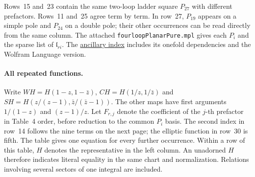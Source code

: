 Rows~15 and~23 contain the same two-loop ladder square \(P_{27}\) with
different prefactors. Rows~11 and~25 agree term by term. In row~27,
\(P_{19}\) appears on a simple pole and \(P_{24}\) on a double pole; their
other occurrences can be read directly from the same column. The attached
\texttt{fourloopPlanarPure.mpl} gives each \(P_i\) and the sparse list of
\(\mathfrak{l}_{ri}\). The \href{https://github.com/windfolgen/svbwalkthrough/tree/main/anc}{ancillary index}
includes its onefold dependencies and the Wolfram Language version.

\clearpage
\paragraph{All repeated functions.}
Write \(WH=H(1-z,1-\bar z)\), \(CH=H(1/z,1/\bar z)\) and
\(SH=H(z/(z-1),\bar z/(\bar z-1))\). The other maps have first arguments
\(1/(1-z)\) and \((z-1)/z\). Let \(F_{r,j}\) denote the coefficient of the \(j\)-th prefactor in Table~4 order, before reduction to the common \(P_i\) basis. The second index in row~14 follows the nine terms on the next page; the elliptic function in row~30 is fifth. The table gives one equation for every further
occurrence. Within a row of this table, \(H\) denotes the representative in the
left column. An unadorned \(H\) therefore indicates literal equality in the
same chart and normalization. Relations involving several sectors of one
integral are included.
